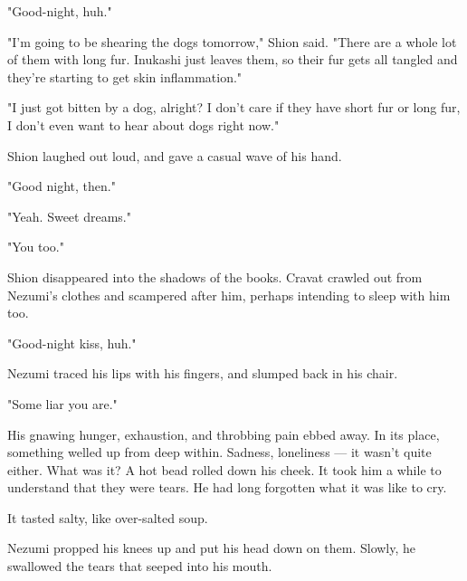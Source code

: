 "Good-night, huh."

"I'm going to be shearing the dogs tomorrow," Shion said. "There are a
whole lot of them with long fur. Inukashi just leaves them, so their fur
gets all tangled and they're starting to get skin inflammation."

"I just got bitten by a dog, alright? I don't care if they have short
fur or long fur, I don't even want to hear about dogs right now."

Shion laughed out loud, and gave a casual wave of his hand.

"Good night, then."

"Yeah. Sweet dreams."

"You too."

Shion disappeared into the shadows of the books. Cravat crawled out from
Nezumi's clothes and scampered after him, perhaps intending to sleep
with him too.

"Good-night kiss, huh."

Nezumi traced his lips with his fingers, and slumped back in his chair.

"Some liar you are."

His gnawing hunger, exhaustion, and throbbing pain ebbed away. In its
place, something welled up from deep within. Sadness, loneliness --- it
wasn't quite either. What was it? A hot bead rolled down his cheek. It
took him a while to understand that they were tears. He had long
forgotten what it was like to cry.

It tasted salty, like over-salted soup.

Nezumi propped his knees up and put his head down on them. Slowly, he
swallowed the tears that seeped into his mouth.